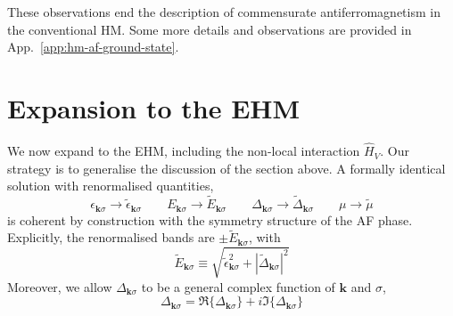 These observations end the description of commensurate antiferromagnetism in the conventional HM. Some more details and observations are provided in App.~\ref{app:hm-af-ground-state}.

\section{Expansion to the EHM}\label{sec:af-ehm}

We now expand to the EHM, including the non-local interaction $\hat H_V$. Our strategy is to generalise the discussion of the section above. A formally identical solution with renormalised quantities,
\[
	\epsilon_{\mathbf{k}\sigma} \to \tilde{\epsilon}_{\mathbf{k}\sigma}
	\qquad
	E_{\mathbf{k}\sigma} \to \tilde{E}_{\mathbf{k}\sigma}
	\qquad
	\Delta_{\mathbf{k}\sigma} \to \tilde{\Delta}_{\mathbf{k}\sigma}
	\qquad
	\mu \to \tilde{\mu}
\]
is coherent by construction with the symmetry structure of the AF phase. Explicitly, the renormalised bands are $\pm \tilde{E}_{\mathbf{k}\sigma}$, with
\[
\tilde{E}_{\mathbf{k}\sigma} \equiv \sqrt{\tilde{\epsilon}_{\mathbf{k}\sigma}^2 + |\tilde{\Delta}_{\mathbf{k}\sigma}|^2}
\]
Moreover, we allow $\Delta_{\mathbf{k}\sigma}$ to be a general complex function of $\mathbf{k}$ and $\sigma$,
\[
\Delta_{\mathbf{k}\sigma} = \Re \lbrace \Delta_{\mathbf{k}\sigma} \rbrace + i \Im \lbrace \Delta_{\mathbf{k}\sigma} \rbrace
\]

